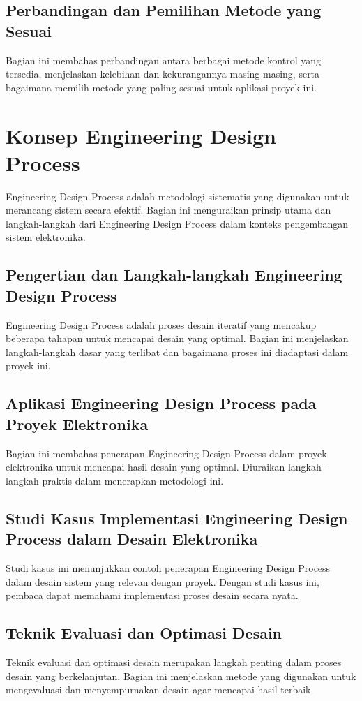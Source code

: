 \subsection{Perbandingan dan Pemilihan Metode yang Sesuai}
Bagian ini membahas perbandingan antara berbagai metode kontrol yang tersedia, menjelaskan kelebihan dan kekurangannya masing-masing, serta bagaimana memilih metode yang paling sesuai untuk aplikasi proyek ini.

\section{Konsep Engineering Design Process}
Engineering Design Process adalah metodologi sistematis yang digunakan untuk merancang sistem secara efektif. Bagian ini menguraikan prinsip utama dan langkah-langkah dari Engineering Design Process dalam konteks pengembangan sistem elektronika.

\subsection{Pengertian dan Langkah-langkah Engineering Design Process}
Engineering Design Process adalah proses desain iteratif yang mencakup beberapa tahapan untuk mencapai desain yang optimal. Bagian ini menjelaskan langkah-langkah dasar yang terlibat dan bagaimana proses ini diadaptasi dalam proyek ini.

\subsection{Aplikasi Engineering Design Process pada Proyek Elektronika}
Bagian ini membahas penerapan Engineering Design Process dalam proyek elektronika untuk mencapai hasil desain yang optimal. Diuraikan langkah-langkah praktis dalam menerapkan metodologi ini.

\subsection{Studi Kasus Implementasi Engineering Design Process dalam Desain Elektronika}
Studi kasus ini menunjukkan contoh penerapan Engineering Design Process dalam desain sistem yang relevan dengan proyek. Dengan studi kasus ini, pembaca dapat memahami implementasi proses desain secara nyata.

\subsection{Teknik Evaluasi dan Optimasi Desain}
Teknik evaluasi dan optimasi desain merupakan langkah penting dalam proses desain yang berkelanjutan. Bagian ini menjelaskan metode yang digunakan untuk mengevaluasi dan menyempurnakan desain agar mencapai hasil terbaik.

